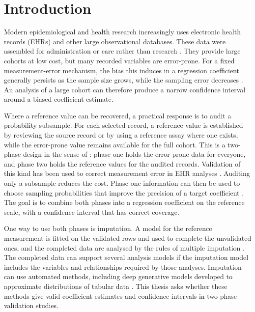 \chapter{Introduction}
\label{chap:intro}

Modern epidemiological and health research increasingly uses electronic health records (EHRs) and other large observational databases. These data were assembled for administration or care rather than research \citep{goldstein2016, hubbard2015}. They provide large cohorts at low cost, but many recorded variables are error-prone. For a fixed measurement-error mechanism, the bias this induces in a regression coefficient generally persists as the sample size grows, while the sampling error decreases \citep{carroll2006measurement}. An analysis of a large cohort can therefore produce a narrow confidence interval around a biased coefficient estimate.

Where a reference value can be recovered, a practical response is to audit a probability subsample. For each selected record, a reference value is established by reviewing the source record or by using a reference assay where one exists, while the error-prone value remains available for the full cohort. This is a two-phase design in the sense of \citet{neyman1938contribution}: phase one holds the error-prone data for everyone, and phase two holds the reference values for the audited records. Validation of this kind has been used to correct measurement error in EHR analyses \citep{giganti2020accounting, shepherd2023multiwave, amorim2021two}. Auditing only a subsample reduces the cost. Phase-one information can then be used to choose sampling probabilities that improve the precision of a target coefficient \citep{amorim2021two, shepherd2023multiwave}. The goal is to combine both phases into a regression coefficient on the reference scale, with a confidence interval that has correct coverage.

One way to use both phases is imputation. A model for the reference measurement is fitted on the validated rows and used to complete the unvalidated ones, and the completed data are analysed by the rules of multiple imputation \citep{Rubin1987}. The completed data can support several analysis models if the imputation model includes the variables and relationships required by those analyses. Imputation can use automated methods, including deep generative models developed to approximate distributions of tabular data \citep{yoon2018gain, kotelnikov2023tabddpm}. This thesis asks whether these methods give valid coefficient estimates and confidence intervals in two-phase validation studies.

